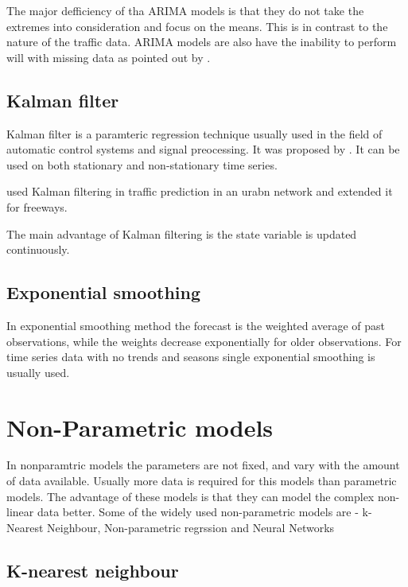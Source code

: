 The major defficiency of tha ARIMA models is that they do not take the extremes into
consideration and focus on the means. This is in contrast to the nature of the traffic data.
ARIMA models are also have the inability to perform will with missing data as pointed out by
\citet{smith1997traffic}.


\subsection{Kalman filter}
Kalman filter is a paramteric regression technique usually used in the field of automatic control
systems and signal preocessing. It was proposed by \citet{kalman1960new}. It can be used on both
stationary and non-stationary time series.

\citet{okutani1984dynamic} used Kalman filtering in traffic prediction in an urabn network and
extended it for freeways.

\citet{wang2005real}

\citet{xie2007short}

\citet{guo2010real}

\citet{guo2014adaptive}

The main advantage of Kalman filtering is the state variable is updated continuously.

\subsection{Exponential smoothing}
In exponential smoothing method the forecast is the weighted average of past observations, while
the weights decrease exponentially for older observations. For time series data with no trends
and seasons single exponential smoothing is usually used.


\section{Non-Parametric models}
In nonparamtric models the parameters are not fixed, and vary with the amount of data available.
Usually more data is required for this models than parametric models. The advantage of these models
is that they can model the complex non-linear data better. Some of the widely used non-parametric
models are - k-Nearest Neighbour, Non-parametric regrssion and Neural Networks

\subsection{K-nearest neighbour}

